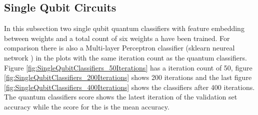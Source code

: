 \clearpage
\subsection{Single Qubit Circuits}
\label{subsection:single_qubit_circuits}

In this subsection two single qubit quantum classifiers with feature embedding between weights and a total count of six weights a have been trained. For comparison there is also a Multi-layer Perceptron classifier (sklearn neureal network \href{https://scikit-learn.org/stable/modules/generated/sklearn.neural_network.MLPClassifier.html}{}) in the plots with the same iteration count as the quantum classifiers. Figure \ref{fig:SingleQubitClassifiers_50Iterations} has a iteration count of 50, figure \ref{fig:SingleQubitClassifiers_200Iterations} shows 200 iterations and the last figure \ref{fig:SingleQubitClassifiers_400Iterations} shows the classifiers after 400 iterations. The quantum classifiers score shows the latest iteration of the validation set accuracy while the score for the  is the mean accuracy.\\
\\

